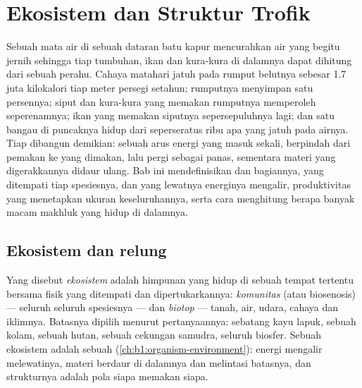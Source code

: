 \chapter{Ekosistem dan Struktur Trofik}\label{ch:b1:ecosystem-organization}

Sebuah mata air di sebuah dataran batu kapur mencurahkan air yang
begitu jernih sehingga tiap tumbuhan, ikan dan kura-kura di dalamnya
dapat dihitung dari sebuah perahu. Cahaya matahari jatuh pada rumput
belutnya sebesar \qty{1.7}{} juta kilokalori tiap meter persegi
setahun; rumputnya menyimpan satu persennya; siput dan kura-kura yang
memakan rumputnya memperoleh seperenamnya; ikan yang memakan siputnya
sepersepuluhnya lagi; dan satu bangau di puncaknya hidup dari
seperseratus ribu apa yang jatuh pada airnya. Tiap  dibangun
demikian: sebuah arus energi yang masuk sekali, berpindah dari pemakan
ke yang dimakan, lalu pergi sebagai panas, sementara materi yang
digerakkannya didaur ulang. Bab ini mendefinisikan  dan
bagiannya,  yang ditempati tiap spesiesnya,  dan
 yang lewatnya energinya mengalir, produktivitas yang
menetapkan ukuran keseluruhannya, serta cara menghitung berapa banyak
macam makhluk yang hidup di dalamnya.

\section{Ekosistem dan relung}

\begin{definition}\label{def:b1:ecosystem-organization:ecosystem}
Yang disebut \emph{ekosistem} adalah himpunan  yang hidup di
sebuah tempat tertentu bersama  fisik yang ditempati dan
dipertukarkannya: \emph{komunitas} (atau biosenosis) --- seluruh
 seluruh spesiesnya --- dan \emph{biotop} --- tanah, air,
udara, cahaya dan iklimnya. Batasnya dipilih menurut pertanyaannya:
sebatang kayu lapuk, sebuah kolam, sebuah hutan, sebuah cekungan
samudra, seluruh biosfer. Sebuah ekosistem adalah sebuah  (\cref{ch:b1:organism-environment}): energi mengalir
melewatinya, materi berdaur di dalamnya dan melintasi batasnya, dan
strukturnya adalah pola siapa memakan siapa.
\end{definition}

